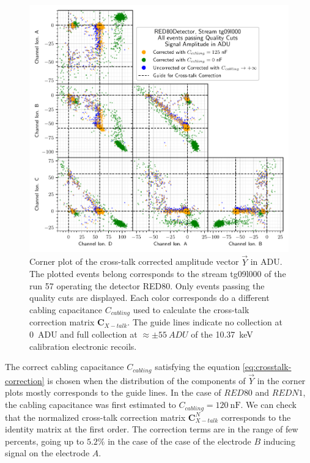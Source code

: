 \begin{figure}
\centering
\includegraphics[scale=1]{Figures/ElectrodesExperimental/red80_crosstalk_correction.pdf}
\caption{Corner plot of the cross-talk corrected amplitude vector $\vec{Y}$ in ADU. The plotted events belong corresponds to the stream tg09l000 of the run 57 operating the detector RED80. Only events passing the quality cuts are displayed. Each color corresponds do a different cabling capacitance $C_{cabling}$ used to calculate the cross-talk correction matrix $\bm{C}_{X-talk}$. The guide lines indicate no collection at \SI{0}{ADU} and full collection at $\approx \pm \SI{55}{ADU}$ of the \SI{10.37}{\kilo\eV} calibration electronic recoils.}
\label{fig:red80-crosstalk-correction}
\end{figure}

The correct cabling capacitance $C_{cabling}$ satisfying the equation \ref{eq:crosstalk-correction} is chosen when the distribution of the components of $\vec{Y}$ in the corner plots mostly corresponds to the guide lines.
In the case of $RED80$ and $REDN1$, the cabling capacitance was first estimated to $C_{cabling} = \SI{120}{\nano\farad}$. 
We  can check that the normalized cross-talk correction matrix $\bm{C}_{X-talk}^N$ corresponds to the identity matrix at the first order. The correction terms are in the range of few percents, going up to $5.2\%$ in the case of the case of the electrode $B$ inducing signal on the electrode $A$.

